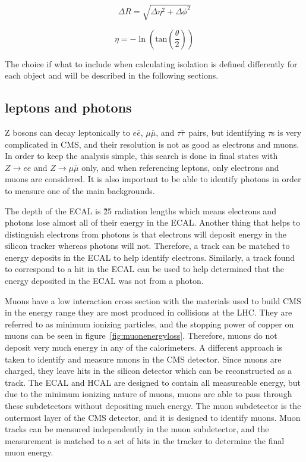 \begin{equation}
  \label{eqn:DR}
  \Delta R = \sqrt{\Delta\eta^{2}+\Delta\phi^{2}}
\end{equation}

\begin{equation}
  \label{eqn:psuedorapidity}
  \eta = -\ln(\mathrm{tan}(\frac{\theta}{2}))
\end{equation}

The choice if what to include when calculating isolation is defined differently for each object and will be described in the following sections.

\subsection{leptons and photons}
\label{ssec:lepsandphots}
Z bosons can decay leptonically to $e\bar{e}$, $\mu\bar{\mu}$, and $\tau\bar{\tau}$~pairs,
but identifying $\tau$s is very complicated in CMS, and their resolution is not as good as electrons and muons.
In order to keep the analysis simple, this search is done in final states with $Z\rightarrow ee$ and $Z\rightarrow\mu\bar{\mu}$ only,
and when referencing leptons, only electrons and muons are considered.
It is also important to be able to identify photons in order to measure one of the main backgrounds.

The depth of the ECAL is \~25 radiation lengths which means electrons and photons lose almost all of their energy in the ECAL.
Another thing that helps to distinguish electrons from photons is that electrons will deposit energy in the silicon tracker whereas photons will not.
Therefore, a track can be matched to energy deposits in the ECAL to help identify electrons.
Similarly, a track found to correspond to a hit in the ECAL can be used to help determined that the energy deposited in the ECAL was not from a photon.

Muons have a low interaction cross section with the materials used to build CMS in the energy range they are most produced in collisions at the LHC.
They are referred to as minimum ionizing particles, and the stopping power of copper on muons can be seen in figure~\ref{fig:muonenergyloss}.
Therefore, muons do not deposit very much energy in any of the calorimeters.
A different approach is taken to identify and measure muons in the CMS detector.
Since muons are charged, they leave hits in the silicon detector which can be reconstructed as a track.
The ECAL and HCAL are designed to contain all measureable energy,
but due to the minimum ionizing nature of muons, muons are able to pass through these subdetectors without depositing much energy.
The muon subdetector is the outermost layer of the CMS detector, and it is designed to identify muons.
Muon tracks can be measured independently in the muon subdetector,
and the measurement is matched to a set of hits in the tracker to determine the final muon energy.

